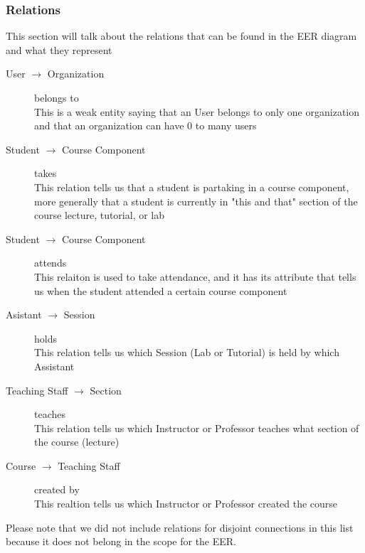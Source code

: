 \documentclass[a4paper, 12pt]{article}
\begin{document}
      \newpage
      \subsubsection{Relations}
        \noindent This section will talk about the relations that can be found in the EER diagram and what they represent
        \vspace{1mm}

        \begin{description}
          \item[User $\rightarrow$ Organization] belongs to\\
            This is a weak entity saying that an User belongs to only one organization and that an organization can have 0 to many users
          \item[Student $\rightarrow$ Course Component] takes\\
            This relation tells us that a student is partaking in a course component, more generally that a student is currently in "this and that" section of the course
            lecture, tutorial, or lab
          \item[Student $\rightarrow$ Course Component] attends\\
            This relaiton is used to take attendance, and it has its attribute that tells us when the student attended a certain course component
          \item[Asistant $\rightarrow$ Session] holds\\
            This relation tells us which Session (Lab or Tutorial) is held by which Assistant
          \item[Teaching Staff $\rightarrow$ Section] teaches\\
            This relation tells us which Instructor or Professor teaches what section of the course (lecture)
          \item[Course $\rightarrow$ Teaching Staff] created by\\
            This realtion tells us which Instructor or Professor created the course
        \end{description}

        \begin{tcolorbox}[title=Note]
          Please note that we did not include relations for disjoint connections in this list because it does not belong in the scope for the EER.
        \end{tcolorbox}

        \newpage
\end{document}
